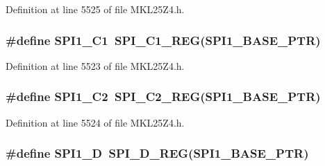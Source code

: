 Definition at line 5525 of file M\+K\+L25\+Z4.\+h.

\subsubsection[{\texorpdfstring{S\+P\+I1\+\_\+\+C1}{SPI1_C1}}]{\setlength{\rightskip}{0pt plus 5cm}\#define S\+P\+I1\+\_\+\+C1~{\bf S\+P\+I\+\_\+\+C1\+\_\+\+R\+EG}({\bf S\+P\+I1\+\_\+\+B\+A\+S\+E\+\_\+\+P\+TR})}\hypertarget{group___s_p_i___register___accessor___macros_gac7fea0baef7ede9b0093340177738db3}{}\label{group___s_p_i___register___accessor___macros_gac7fea0baef7ede9b0093340177738db3}


Definition at line 5523 of file M\+K\+L25\+Z4.\+h.

\subsubsection[{\texorpdfstring{S\+P\+I1\+\_\+\+C2}{SPI1_C2}}]{\setlength{\rightskip}{0pt plus 5cm}\#define S\+P\+I1\+\_\+\+C2~{\bf S\+P\+I\+\_\+\+C2\+\_\+\+R\+EG}({\bf S\+P\+I1\+\_\+\+B\+A\+S\+E\+\_\+\+P\+TR})}\hypertarget{group___s_p_i___register___accessor___macros_ga5d52f8ca27c80d7eb3a836511927c3e4}{}\label{group___s_p_i___register___accessor___macros_ga5d52f8ca27c80d7eb3a836511927c3e4}


Definition at line 5524 of file M\+K\+L25\+Z4.\+h.

\subsubsection[{\texorpdfstring{S\+P\+I1\+\_\+D}{SPI1_D}}]{\setlength{\rightskip}{0pt plus 5cm}\#define S\+P\+I1\+\_\+D~{\bf S\+P\+I\+\_\+\+D\+\_\+\+R\+EG}({\bf S\+P\+I1\+\_\+\+B\+A\+S\+E\+\_\+\+P\+TR})}\hypertarget{group___s_p_i___register___accessor___macros_ga8760cd86fbace95539c11d135eb57011}{}\label{group___s_p_i___register___accessor___macros_ga8760cd86fbace95539c11d135eb57011}


